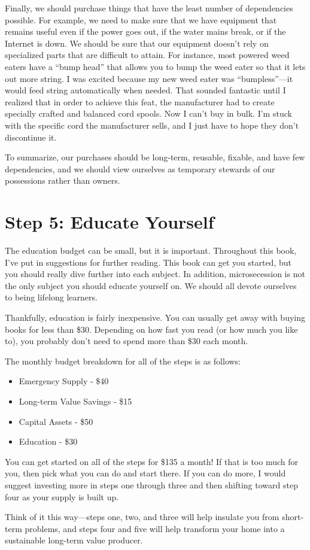 \begin{infonote}
Finally, we should purchase things that have the least number of
dependencies possible.
For example, we need
to make sure that we have equipment that remains useful even if the
power goes out, if the water mains break, or if the Internet is down.
We should be sure that our equipment doesn't rely on
specialized parts that are difficult to attain. For instance, most
powered weed eaters have a “bump head” that allows you to bump the weed
eater so that it lets out more string. I was excited because my new
weed eater was “bumpless”—it would feed string automatically when
needed. That sounded fantastic until I realized that in order to
achieve this feat, the manufacturer had to create specially crafted and
balanced cord spools. Now I can't buy in bulk.
I'm stuck with the specific cord the manufacturer
sells, and I just have to hope they don't discontinue
it.

To summarize, our purchases should be long-term, reusable, fixable, and
have few dependencies, and we should view ourselves as temporary
stewards of our possessions rather than owners.
\end{infonote}

\section{Step 5: Educate Yourself}

The education budget can be small, but it is important. Throughout this
book, I've put in suggestions for further reading.
This book can get you started, but you should really dive further into
each subject. In addition, microsecession is not the only subject you
should educate yourself on. We should all devote ourselves to being
lifelong learners.

Thankfully, education is fairly inexpensive. You can usually get away
with buying books for less than \$30. Depending on how fast you read
(or how much you like to), you probably don't need to
spend more than \$30 each month. 

The monthly budget breakdown for all of the steps is as follows:

\begin{itemize}
\item 
Emergency Supply - \$40
\item 
Long-term Value Savings - \$15
\item 
Capital Assets - \$50
\item 
Education - \$30
\end{itemize}

You can get started on all of the steps for \$135 a
month! If that is too
much for you, then pick what you can do and start there. If you can do
more, I would suggest investing more in steps one through three and
then shifting toward step four as your supply is built up.

Think of it this way—steps one, two, and three will help insulate you
from short-term problems, and steps four and five will help transform
your home into a sustainable long-term value producer.

